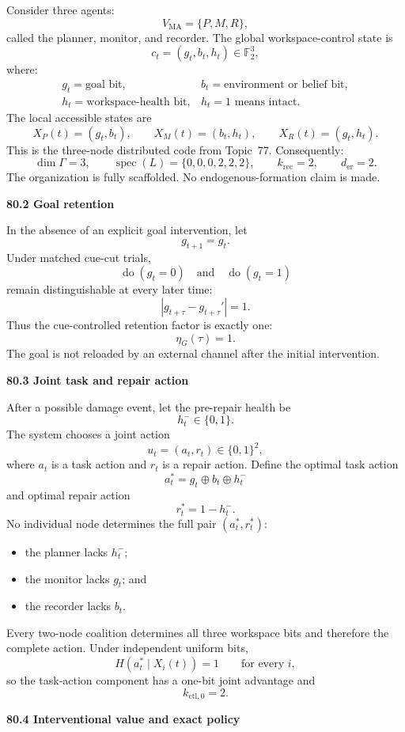 \documentclass[11pt,letterpaper]{article}
\DeclareMathOperator{\spec}{spec}
\newcommand{\subtopic}[1]{%
 \vspace{0.45em}
 {\bfseries\color{AccentColor} #1\par}
}
\theoremstyle{plain}
\theoremstyle{definition}
\begin{document}
Consider three agents:
\[
V_{\mathrm{MA}}=\{P,M,R\},
\]
called the planner, monitor, and recorder. The global workspace-control state
is
\[
c_t=(g_t,b_t,h_t)\in\mathbb F_2^3,
\]
where:
\[
\begin{array}{ll}
g_t=\text{goal bit},
&b_t=\text{environment or belief bit},\\
h_t=\text{workspace-health bit},
&h_t=1\text{ means intact}.
\end{array}
\]
The local accessible states are
\[
X_P(t)=(g_t,b_t),
\qquad
X_M(t)=(b_t,h_t),
\qquad
X_R(t)=(g_t,h_t).
\]
This is the three-node distributed code from Topic~77. Consequently:
\[
\dim\Gamma=3,
\qquad
\spec(L)=\{0,0,0,2,2,2\},
\qquad
k_{\mathrm{rec}}=2,
\qquad
d_{\mathrm{er}}=2.
\]
The organization is fully scaffolded. No endogenous-formation claim is made.

\subtopic{80.2 Goal retention}

In the absence of an explicit goal intervention, let
\[
g_{t+1}=g_t.
\]
Under matched cue-cut trials,
\[
\operatorname{do}(g_t=0)
\quad\text{and}\quad
\operatorname{do}(g_t=1)
\]
remain distinguishable at every later time:
\[
|g_{t+\tau}-g_{t+\tau}'|=1.
\]
Thus the cue-controlled retention factor is exactly one:
\[
\eta_G(\tau)=1.
\]
The goal is not reloaded by an external channel after the initial intervention.

\subtopic{80.3 Joint task and repair action}

After a possible damage event, let the pre-repair health be
\[
h_t^-\in\{0,1\}.
\]
The system chooses a joint action
\[
u_t=(a_t,r_t)\in\{0,1\}^2,
\]
where \(a_t\) is a task action and \(r_t\) is a repair action. Define the
optimal task action
\[
a_t^*=g_t\oplus b_t\oplus h_t^-
\]
and optimal repair action
\[
r_t^*=1-h_t^-.
\]
No individual node determines the full pair \((a_t^*,r_t^*)\):
\begin{itemize}
\item the planner lacks \(h_t^-\);
\item the monitor lacks \(g_t\); and
\item the recorder lacks \(b_t\).
\end{itemize}
Every two-node coalition determines all three workspace bits and therefore the
complete action. Under independent uniform bits,
\[
H(a_t^*\mid X_i(t))=1
\qquad\text{for every }i,
\]
so the task-action component has a one-bit joint advantage and
\[
k_{\mathrm{ctl},0}=2.
\]

\subtopic{80.4 Interventional value and exact policy}
\end{document}
